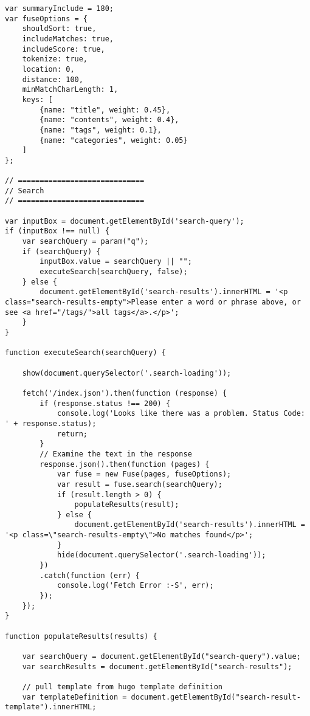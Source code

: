 \documentclass[11pt]{article}
\begin{document}
\begin{verbatim}
var summaryInclude = 180;
var fuseOptions = {
    shouldSort: true,
    includeMatches: true,
    includeScore: true,
    tokenize: true,
    location: 0,
    distance: 100,
    minMatchCharLength: 1,
    keys: [
        {name: "title", weight: 0.45},
        {name: "contents", weight: 0.4},
        {name: "tags", weight: 0.1},
        {name: "categories", weight: 0.05}
    ]
};

// =============================
// Search
// =============================

var inputBox = document.getElementById('search-query');
if (inputBox !== null) {
    var searchQuery = param("q");
    if (searchQuery) {
        inputBox.value = searchQuery || "";
        executeSearch(searchQuery, false);
    } else {
        document.getElementById('search-results').innerHTML = '<p class="search-results-empty">Please enter a word or phrase above, or see <a href="/tags/">all tags</a>.</p>';
    }
}

function executeSearch(searchQuery) {

    show(document.querySelector('.search-loading'));

    fetch('/index.json').then(function (response) {
        if (response.status !== 200) {
            console.log('Looks like there was a problem. Status Code: ' + response.status);
            return;
        }
        // Examine the text in the response
        response.json().then(function (pages) {
            var fuse = new Fuse(pages, fuseOptions);
            var result = fuse.search(searchQuery);
            if (result.length > 0) {
                populateResults(result);
            } else {
                document.getElementById('search-results').innerHTML = '<p class=\"search-results-empty\">No matches found</p>';
            }
            hide(document.querySelector('.search-loading'));
        })
        .catch(function (err) {
            console.log('Fetch Error :-S', err);
        });
    });
}

function populateResults(results) {

    var searchQuery = document.getElementById("search-query").value;
    var searchResults = document.getElementById("search-results");

    // pull template from hugo template definition
    var templateDefinition = document.getElementById("search-result-template").innerHTML;


\end{verbatim}
\end{document}

